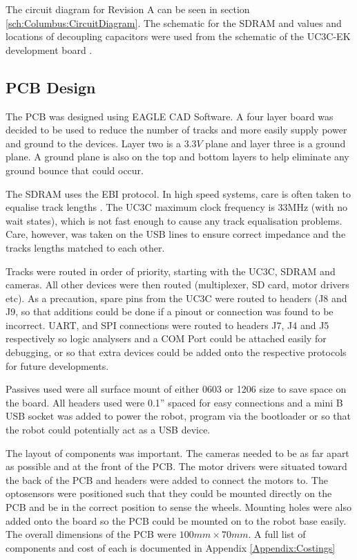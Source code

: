 The circuit diagram for Revision A can be seen in section \ref{sch:Columbus:CircuitDiagram}. The schematic for the SDRAM and values and locations of decoupling capacitors were used from the schematic of the UC3C-EK development board \citep{Atmel:UC3CEK}. 
\subsection{PCB Design}
The PCB was designed using EAGLE CAD Software. A four layer board was decided to be used to reduce the number of tracks and more easily supply power and ground to the devices. Layer two is a $3.3V$ plane and layer three is a ground plane. A ground plane is also on the top and bottom layers to help eliminate any ground bounce that could occur. 

The SDRAM uses the EBI protocol. In high speed systems, care is often taken to equalise track lengths \citep{liu2004equalization}. The UC3C maximum clock frequency is 33MHz (with no wait states), which is not fast enough to cause any track equalisation problems. Care, however, was taken on the USB lines to ensure correct impedance and the tracks lengths matched to each other.

Tracks were routed in order of priority, starting with the UC3C, SDRAM and cameras. All other devices were then routed (\itc multiplexer, SD card, motor drivers etc). As a precaution, spare pins from the UC3C were routed to headers (J8 and J9, so that additions could be done if a pinout or connection was found to be incorrect. UART, \itc and SPI connections were routed to headers J7, J4 and J5 respectively so logic analysers and a COM Port could be attached easily for debugging, or so that extra devices could be added onto the respective protocols for future developments. 

Passives used were all surface mount of either 0603 or 1206 size to save space on the board. All headers used were 0.1'' spaced for easy connections and a mini B USB socket was added to power the robot, program via the bootloader or so that the robot could potentially act as a USB device. 

The layout of components was important. The cameras needed to be as far apart as possible and at the front of the PCB. The motor drivers were situated toward the back of the PCB and headers were added to connect the motors to. The optosensors were positioned such that they could be mounted directly on the PCB and be in the correct position to sense the wheels. Mounting holes were also added onto the board so the PCB could be mounted on to the robot base easily. The overall dimensions of the PCB were $100mm \times 70mm$. A full list of components and cost of each is documented in Appendix \ref{Appendix:Costings}


